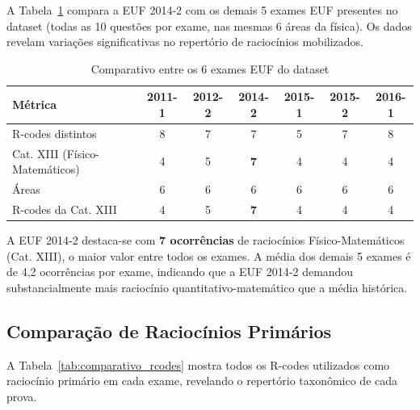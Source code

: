 \documentclass[12pt,a4paper]{article}
\begin{document}
A Tabela~\ref{tab:comparativo} compara a EUF 2014-2 com os demais 5
exames EUF presentes no dataset (todas as 10 questões por exame, nas
mesmas 6 áreas da física). Os dados revelam variações significativas
no repertório de raciocínios mobilizados.

\begin{table}[H]
\centering
\caption{Comparativo entre os 6 exames EUF do dataset}
\label{tab:comparativo}
\begin{tabular}{lcccccc}
\toprule
\textbf{Métrica} & \textbf{2011-1} & \textbf{2012-2} & \textbf{2014-2} & \textbf{2015-1} & \textbf{2015-2} & \textbf{2016-1} \\
\midrule
R-codes distintos & 8 & 7 & 7 & 5 & 7 & 8 \\
Cat. XIII (Físico-Matemáticos) & 4 & 5 & \textbf{7} & 4 & 4 & 4 \\
Áreas & 6 & 6 & 6 & 6 & 6 & 6 \\
R-codes da Cat. XIII & 4 & 5 & \textbf{7} & 4 & 4 & 4 \\
\bottomrule
\end{tabular}
\end{table}

\noindent A EUF 2014-2 destaca-se com \textbf{7 ocorrências} de
raciocínios Físico-Matemáticos (Cat. XIII), o maior valor entre todos
os exames. A média dos demais 5 exames é de 4,2 ocorrências por exame,
indicando que a EUF 2014-2 demandou substancialmente mais raciocínio
quantitativo-matemático que a média histórica.

\subsection{Comparação de Raciocínios Primários}

A Tabela~\ref{tab:comparativo_rcodes} mostra todos os R-codes utilizados
como raciocínio primário em cada exame, revelando o repertório
taxonômico de cada prova.
\end{document}
